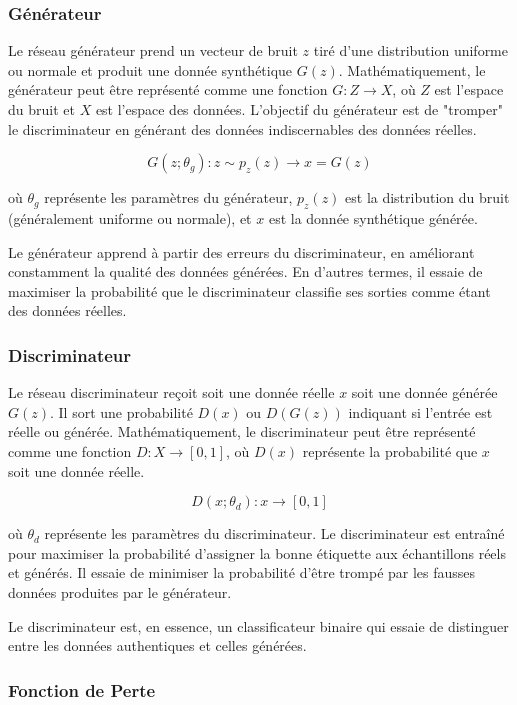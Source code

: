 \subsubsection{Générateur}

Le réseau générateur prend un vecteur de bruit \( z \) tiré d’une distribution
uniforme ou normale et produit une donnée synthétique \( G(z) \).
Mathématiquement, le générateur peut être représenté comme une fonction \( G :
Z \rightarrow X \), où \( Z \) est l'espace du bruit et \( X \) est l'espace
des données. L’objectif du générateur est de "tromper" le discriminateur en
générant des données indiscernables des données réelles.

\[
	G(z; \theta_g) : z \sim p_z(z) \rightarrow x = G(z)
\]

où \( \theta_g \) représente les paramètres du générateur, \( p_z(z) \) est la
distribution du bruit (généralement uniforme ou normale), et \( x \) est la
donnée synthétique générée.

Le générateur apprend à partir des erreurs du discriminateur, en améliorant
constamment la qualité des données générées. En d'autres termes, il essaie de
maximiser la probabilité que le discriminateur classifie ses sorties comme
étant des données réelles.

\subsubsection{Discriminateur}

Le réseau discriminateur reçoit soit une donnée réelle \( x \) soit une donnée
générée \( G(z) \). Il sort une probabilité \( D(x) \) ou \( D(G(z)) \)
indiquant si l’entrée est réelle ou générée. Mathématiquement, le
discriminateur peut être représenté comme une fonction \( D : X \rightarrow [0,
	1] \), où \( D(x) \) représente la probabilité que \( x \) soit une donnée
réelle.

\[
	D(x; \theta_d) : x \rightarrow [0, 1]
\]

où \( \theta_d \) représente les paramètres du discriminateur. Le
discriminateur est entraîné pour maximiser la probabilité d’assigner la bonne
étiquette aux échantillons réels et générés. Il essaie de minimiser la
probabilité d'être trompé par les fausses données produites par le générateur.

Le discriminateur est, en essence, un classificateur binaire qui essaie de
distinguer entre les données authentiques et celles générées.

\subsubsection{Fonction de Perte}

